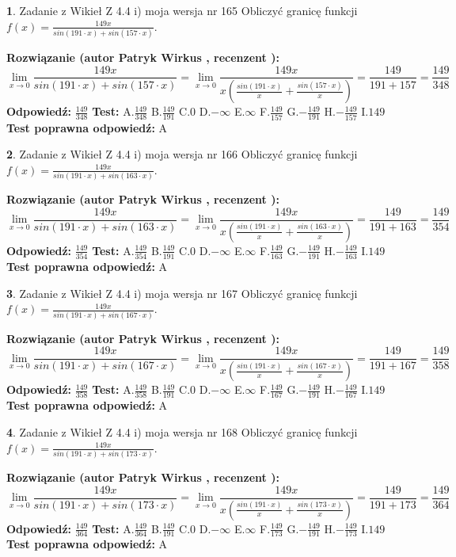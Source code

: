 \documentclass[12pt, a4paper]{article}
\theoremstyle{definition} %
\newtheorem{zad}{}
\newcommand{\zadStart}[1]{\begin{zad}#1\newline}
\newcommand{\zadStop}{\end{zad}}
\newcommand{\rozwStart}[2]{\noindent \textbf{Rozwiązanie (autor #1 , recenzent #2): }\newline}
\newcommand{\rozwStop}{\newline}
\newcommand{\odpStart}{\noindent \textbf{Odpowiedź:}\newline}
\newcommand{\odpStop}{\newline}
\newcommand{\testStart}{\noindent \textbf{Test:}\newline}
\newcommand{\testStop}{\newline}
\newcommand{\kluczStart}{\noindent \textbf{Test poprawna odpowiedź:}\newline}
\newcommand{\kluczStop}{\newline}
\begin{document}
\zadStart{Zadanie z Wikieł Z 4.4 i) moja wersja nr 165}
Obliczyć granicę funkcji $f(x)=\frac{149x}{sin(191\cdot x) +sin(157\cdot x)}$.
\zadStop
\rozwStart{Patryk Wirkus}{}
$$\lim\limits_{x\to 0}\frac{149x}{sin(191\cdot x) +sin(157\cdot x)}=\lim\limits_{x\to 0}\frac{149x}{x(\frac{sin(191\cdot x)}{x}+\frac{sin(157\cdot x)}{x})}=\frac{149}{191+157} = \frac{149}{348}$$
\rozwStop
\odpStart
$\frac{149}{348}$
\odpStop
\testStart
A.$\frac{149}{348}$
B.$\frac{149}{191}$
C.$0$
D.$-\infty$
E.$\infty$
F.$\frac{149}{157}$
G.$-\frac{149}{191}$
H.$-\frac{149}{157}$
I.$149$
\testStop
\kluczStart
A
\kluczStop



\zadStart{Zadanie z Wikieł Z 4.4 i) moja wersja nr 166}
Obliczyć granicę funkcji $f(x)=\frac{149x}{sin(191\cdot x) +sin(163\cdot x)}$.
\zadStop
\rozwStart{Patryk Wirkus}{}
$$\lim\limits_{x\to 0}\frac{149x}{sin(191\cdot x) +sin(163\cdot x)}=\lim\limits_{x\to 0}\frac{149x}{x(\frac{sin(191\cdot x)}{x}+\frac{sin(163\cdot x)}{x})}=\frac{149}{191+163} = \frac{149}{354}$$
\rozwStop
\odpStart
$\frac{149}{354}$
\odpStop
\testStart
A.$\frac{149}{354}$
B.$\frac{149}{191}$
C.$0$
D.$-\infty$
E.$\infty$
F.$\frac{149}{163}$
G.$-\frac{149}{191}$
H.$-\frac{149}{163}$
I.$149$
\testStop
\kluczStart
A
\kluczStop



\zadStart{Zadanie z Wikieł Z 4.4 i) moja wersja nr 167}
Obliczyć granicę funkcji $f(x)=\frac{149x}{sin(191\cdot x) +sin(167\cdot x)}$.
\zadStop
\rozwStart{Patryk Wirkus}{}
$$\lim\limits_{x\to 0}\frac{149x}{sin(191\cdot x) +sin(167\cdot x)}=\lim\limits_{x\to 0}\frac{149x}{x(\frac{sin(191\cdot x)}{x}+\frac{sin(167\cdot x)}{x})}=\frac{149}{191+167} = \frac{149}{358}$$
\rozwStop
\odpStart
$\frac{149}{358}$
\odpStop
\testStart
A.$\frac{149}{358}$
B.$\frac{149}{191}$
C.$0$
D.$-\infty$
E.$\infty$
F.$\frac{149}{167}$
G.$-\frac{149}{191}$
H.$-\frac{149}{167}$
I.$149$
\testStop
\kluczStart
A
\kluczStop



\zadStart{Zadanie z Wikieł Z 4.4 i) moja wersja nr 168}
Obliczyć granicę funkcji $f(x)=\frac{149x}{sin(191\cdot x) +sin(173\cdot x)}$.
\zadStop
\rozwStart{Patryk Wirkus}{}
$$\lim\limits_{x\to 0}\frac{149x}{sin(191\cdot x) +sin(173\cdot x)}=\lim\limits_{x\to 0}\frac{149x}{x(\frac{sin(191\cdot x)}{x}+\frac{sin(173\cdot x)}{x})}=\frac{149}{191+173} = \frac{149}{364}$$
\rozwStop
\odpStart
$\frac{149}{364}$
\odpStop
\testStart
A.$\frac{149}{364}$
B.$\frac{149}{191}$
C.$0$
D.$-\infty$
E.$\infty$
F.$\frac{149}{173}$
G.$-\frac{149}{191}$
H.$-\frac{149}{173}$
I.$149$
\testStop
\kluczStart
A
\kluczStop
\end{document}
